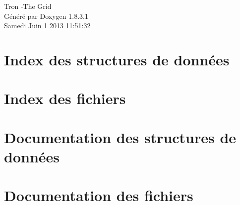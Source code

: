 \documentclass{book}
\begin{document}
\hypersetup{pageanchor=false,citecolor=blue}
\begin{titlepage}
\vspace*{7cm}
\begin{center}
{\Large Tron -\/\-The Grid }\\
\vspace*{1cm}
{\large Généré par Doxygen 1.8.3.1}\\
\vspace*{0.5cm}
{\small Samedi Juin 1 2013 11:51:32}\\
\end{center}
\end{titlepage}
\clearemptydoublepage
{}
\tableofcontents
\clearemptydoublepage
{}
\hypersetup{pageanchor=true,citecolor=blue}
\chapter{Index des structures de données}

\chapter{Index des fichiers}

\chapter{Documentation des structures de données}












\chapter{Documentation des fichiers}




























\printindex
\end{document}
